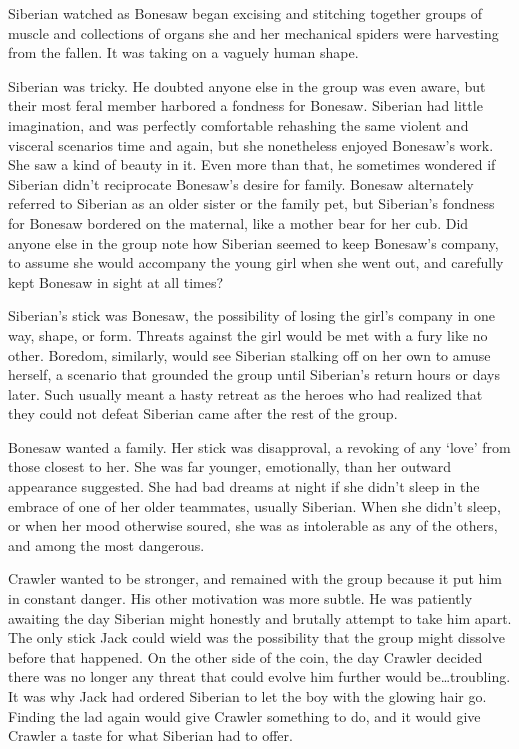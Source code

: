 Siberian watched as Bonesaw began excising and stitching together groups of muscle and collections of organs she and her mechanical spiders were harvesting from the fallen.  It was taking on a vaguely human shape.



Siberian was tricky.  He doubted anyone else in the group was even aware, but their most feral member harbored a fondness for Bonesaw.  Siberian had little imagination, and was perfectly comfortable rehashing the same violent and visceral scenarios time and again, but she nonetheless enjoyed Bonesaw's work.  She saw a kind of beauty in it.  Even more than that, he sometimes wondered if Siberian didn't reciprocate Bonesaw's desire for family.  Bonesaw alternately referred to Siberian as an older sister or the family pet, but Siberian's fondness for Bonesaw bordered on the maternal, like a mother bear for her cub.  Did anyone else in the group note how Siberian seemed to keep Bonesaw's company, to assume she would accompany the young girl when she went out, and carefully kept Bonesaw in sight at all times?



Siberian's stick was Bonesaw, the possibility of losing the girl's company in one way, shape, or form.  Threats against the girl would be met with a fury like no other.  Boredom, similarly, would see Siberian stalking off on her own to amuse herself, a scenario that grounded the group until Siberian's return hours or days later.  Such usually meant a hasty retreat as the heroes who had realized that they could not defeat Siberian came after the rest of the group.



Bonesaw wanted a family.  Her stick was disapproval, a revoking of any `love' from those closest to her.  She was far younger, emotionally, than her outward appearance suggested.  She had bad dreams at night if she didn't sleep in the embrace of one of her older teammates, usually Siberian.  When she didn't sleep, or when her mood otherwise soured, she was as intolerable as any of the others, and among the most dangerous.



Crawler wanted to be stronger, and remained with the group because it put him in constant danger.  His other motivation was more subtle.  He was patiently awaiting the day Siberian might honestly and brutally attempt to take him apart.  The only stick Jack could wield was the possibility that the group might dissolve before that happened.  On the other side of the coin, the day Crawler decided there was no longer any threat that could evolve him further would be\ldots troubling.  It was why Jack had ordered Siberian to let the boy with the glowing hair go.  Finding the lad again would give Crawler something to do, and it would give Crawler a taste for what Siberian had to offer.



